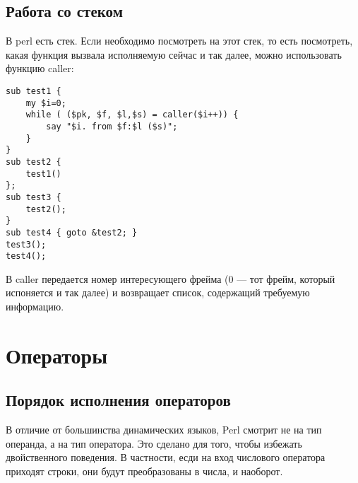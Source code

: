 \subsection{Работа со стеком}
В perl есть стек. Если необходимо посмотреть на этот стек, то есть посмотреть, какая функция вызвала исполняемую сейчас и так далее, можно использовать функцию caller:
\begin{verbatim}
sub test1 {
    my $i=0;
    while ( ($pk, $f, $l,$s) = caller($i++)) {
        say "$i. from $f:$l ($s)";
    }
}
sub test2 {
    test1()
};
sub test3 {
    test2();
}
sub test4 { goto &test2; }
test3();
test4();
\end{verbatim}
В caller передается номер интересующего фрейма (0 --- тот фрейм, который испоняется и так далее) и возвращает список, содержащий требуемую информацию.
\newpage
\section{Операторы} %
\subsection{Порядок исполнения операторов}
В отличие от большинства динамических языков, Perl смотрит не на тип операнда, а на тип оператора. Это сделано для того, чтобы избежать двойственного поведения. В частности, есди на вход числового оператора приходят строки, они будут преобразованы в числа, и наоборот.

